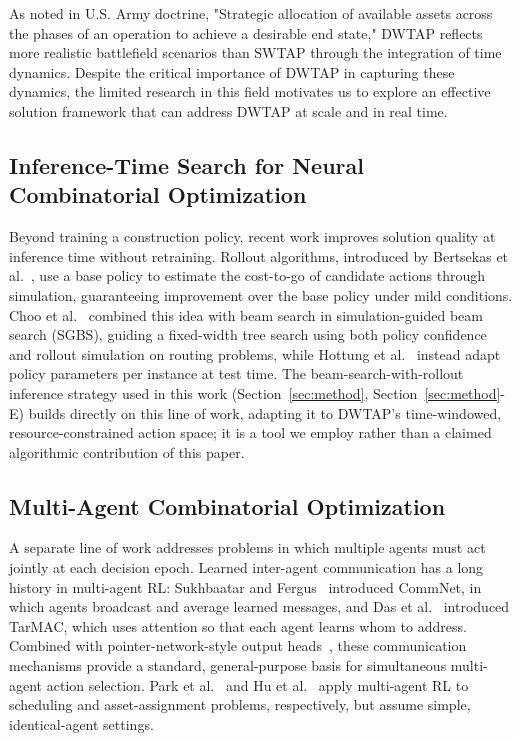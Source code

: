 \documentclass{ieeeaccess}
\begin{document}
As noted in U.S. Army doctrine, "Strategic allocation of available assets across the phases of an operation to achieve a desirable end state," DWTAP reflects more realistic battlefield scenarios than SWTAP through the integration of time dynamics. Despite the critical importance of DWTAP in capturing these dynamics, the limited research in this field motivates us to explore an effective solution framework that can address DWTAP at scale and in real time.

\subsection{Inference-Time Search for Neural Combinatorial Optimization}

Beyond training a construction policy, recent work improves solution quality at inference time without retraining. Rollout algorithms, introduced by Bertsekas et al.~\cite{bertsekas1997rollout}, use a base policy to estimate the cost-to-go of candidate actions through simulation, guaranteeing improvement over the base policy under mild conditions. Choo et al.~\cite{choo2022sgbs} combined this idea with beam search in simulation-guided beam search (SGBS), guiding a fixed-width tree search using both policy confidence and rollout simulation on routing problems, while Hottung et al.~\cite{hottung2022eas} instead adapt policy parameters per instance at test time. The beam-search-with-rollout inference strategy used in this work (Section~\ref{sec:method}, Section~\ref{sec:method}-E) builds directly on this line of work, adapting it to DWTAP's time-windowed, resource-constrained action space; it is a tool we employ rather than a claimed algorithmic contribution of this paper.

\subsection{Multi-Agent Combinatorial Optimization}

A separate line of work addresses problems in which multiple agents must act jointly at each decision epoch. Learned inter-agent communication has a long history in multi-agent RL: Sukhbaatar and Fergus~\cite{sukhbaatar2016commnet} introduced CommNet, in which agents broadcast and average learned messages, and Das et al.~\cite{das2019tarmac} introduced TarMAC, which uses attention so that each agent learns whom to address. Combined with pointer-network-style output heads~\cite{vinyals2015pointer}, these communication mechanisms provide a standard, general-purpose basis for simultaneous multi-agent action selection. Park et al.~\cite{park2021schedulenet} and Hu et al.~\cite{hu2024} apply multi-agent RL to scheduling and asset-assignment problems, respectively, but assume simple, identical-agent settings.
\end{document}
